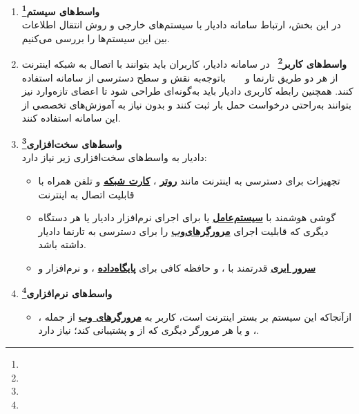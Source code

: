 \documentclass[12pt,a4paper,oneside]{article}
\begin{document}
	\begin{enumerate}
		\item 
		\textbf{واسط‌های سیستم\footnote{}}
		\\
		در این بخش، ارتباط سامانه دادیار با سیستم‌های خارجی و روش انتقال اطلاعات بین این سیستم‌ها را بررسی می‌کنیم.

		\item 
	\textbf{واسط‌های کاربر\footnote{}}
	 در سامانه دادیار، کاربران باید بتوانند با اتصال به شبکه اینترنت از هر دو طریق تارنما و 
	  باتوجه‌به نقش و سطح دسترسی از سامانه استفاده کنند. همچنین رابطه کاربری دادیار باید به‌گونه‌ای طراحی شود تا اعضای تازه‌وارد نیز بتوانند به‌راحتی درخواست حمل بار ثبت کنند و بدون نیاز به آموزش‌های تخصصی از این سامانه استفاده کنند.


	\item 
	\textbf{واسط‌های سخت‌افزاری\footnote{}}
	\\
	دادیار به واسط‌های سخت‌افزاری زیر نیاز دارد:
	
	\begin{itemize}
		\item
		تجهیزات برای دسترسی به اینترنت مانند 
		\hyperref[ref:router]{\textbf{روتر}}
		، 
		\hyperref[ref:networkcard]{\textbf{کارت شبکه}} 
		و تلفن همراه با قابلیت اتصال به اینترنت
		
		\item
		گوشی هوشمند با 
		\hyperref[ref:os]{\textbf{سیستم‌عامل}} 
		 یا 
		برای اجرای نرم‌افزار 
		دادیار یا هر دستگاه دیگری که قابلیت اجرای 
		\hyperref[ref:browser]{\textbf{مرورگرهای‌وب}}
		 را 
		برای دسترسی به تارنما دادیار داشته باشد.
		
		\item
		\hyperref[ref:cloudserver]{\textbf{سرور ابری}}
		 قدرتمند با 
		،
		 و حافظه کافی برای 
		 \hyperref[ref:database]{\textbf{پایگاه‌داده}}
		 ،
		  و 
		  نرم‌افزار 
		  و 

	\end{itemize}


	\item 
	\textbf{واسط‌های نرم‌افزاری\footnote{}}
		\begin{itemize}
			\item
							ازآنجاکه این سیستم بر بستر اینترنت است، کاربر به 
			\hyperref[ref:browser]{\textbf{مرورگرهای وب}}
			از جمله
			، ، 
			و یا هر مرورگر دیگری که از 
			 و 
			پشتیبانی کند؛ نیاز دارد.
			

\end{itemize}
\end{enumerate}
\end{document}
